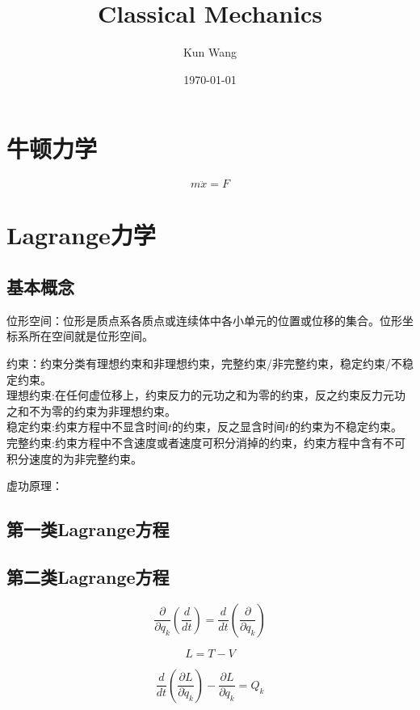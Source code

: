 \documentclass[12pt]{article}
\title{Classical Mechanics}
\author{Kun Wang}
\date{\today}
\numberwithin{equation}{section}
\begin{document}
        \maketitle
        \section{牛顿力学}
        \begin{equation}
            m\ddot{x}=F
        \end{equation}

        \section{Lagrange力学}
        \subsection{基本概念\cite{2006shen}}
        位形空间：位形是质点系各质点或连续体中各小单元的位置或位移的集合。位形坐标系所在空间就是位形空间。\par
        约束：约束分类有理想约束和非理想约束，完整约束/非完整约束，稳定约束/不稳定约束。\\
        理想约束:在任何虚位移上，约束反力的元功之和为零的约束，反之约束反力元功之和不为零的约束为非理想约束。\\
        稳定约束:约束方程中不显含时间$t$的约束，反之显含时间$t$的约束为不稳定约束。\\
        完整约束:约束方程中不含速度或者速度可积分消掉的约束，约束方程中含有不可积分速度的为非完整约束。
        \par
        虚功原理：
        \subsection{第一类Lagrange方程}
        \subsection{第二类Lagrange方程}
        \begin{equation}
            \frac{\partial}{\partial q_k}\left(\frac{d}{dt}\right)=\frac{d}{dt}\left(\frac{\partial}{\partial q_k}\right)
        \end{equation}

        \begin{equation}
            L=T-V
        \end{equation}

        \begin{equation}
            \frac{d}{dt}\left(\frac{\partial L}{\partial \dot{q}_k}\right)-\frac{\partial L}{\partial q_k}=Q_k
        \end{equation}

        
        
    
\end{document}
